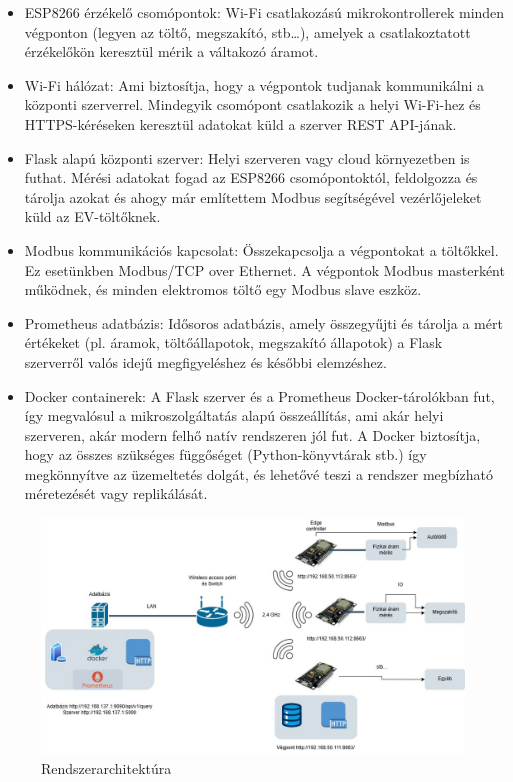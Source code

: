 \begin{itemize}
    \item ESP8266 érzékelő csomópontok: 
    Wi-Fi csatlakozású mikrokontrollerek minden végponton (legyen az töltő, megszakító, stb\dots), 
    amelyek a csatlakoztatott érzékelőkön keresztül mérik a váltakozó áramot.
    \item Wi-Fi hálózat: Ami biztosítja, 
    hogy a végpontok tudjanak kommunikálni a központi szerverrel. 
    Mindegyik csomópont csatlakozik a helyi Wi-Fi-hez 
    és HTTPS-kéréseken keresztül adatokat küld a szerver REST API-jának.
    \item Flask alapú központi szerver: 
    Helyi szerveren vagy cloud környezetben is futhat. 
    Mérési adatokat fogad az ESP8266 csomópontoktól, feldolgozza és tárolja azokat 
    és ahogy már említettem Modbus segítségével vezérlőjeleket küld az EV-töltőknek.
    \item Modbus kommunikációs kapcsolat: 
    Összekapcsolja a végpontokat a töltőkkel. Ez esetünkben Modbus/TCP over Ethernet. 
    A végpontok Modbus masterként működnek, és minden elektromos töltő egy Modbus slave eszköz.
    \item Prometheus adatbázis: 
    Idősoros adatbázis, amely összegyűjti és tárolja a mért értékeket 
    (pl. áramok, töltőállapotok, megszakító állapotok) a Flask szerverről valós idejű megfigyeléshez 
    és későbbi elemzéshez.
    \item Docker containerek: 
    A Flask szerver és a Prometheus  Docker-tárolókban fut, 
    így megvalósul a mikroszolgáltatás alapú összeállítás, ami akár helyi szerveren,
    akár modern felhő natív rendszeren jól fut. A Docker biztosítja, hogy az összes szükséges függőséget 
    (Python-könyvtárak stb.) így megkönnyítve az üzemeltetés dolgát, 
    és lehetővé teszi a rendszer megbízható méretezését vagy replikálását.
\end{itemize}

\begin{figure}[ht]
    \centering
    \includegraphics[width=1\textwidth]{figures/szakdoga.jpg}
    \caption{Rendszerarchitektúra}
    \label{fig:Rendszerarchitektúra}
\end{figure}

